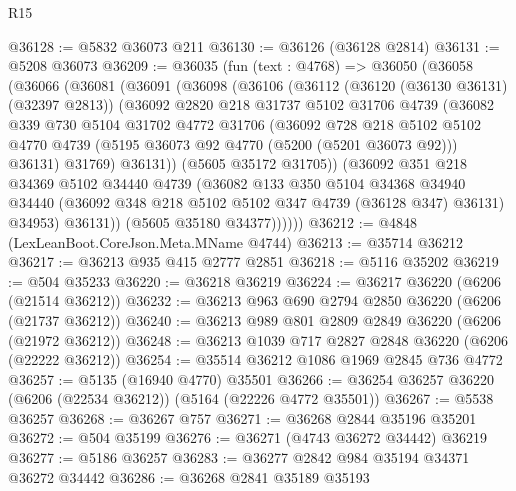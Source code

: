 \begin{lexlean}{R15}
\begin{coremodule}
{{{{{{{{{{{@36128 := @5832 @36073 @211
@36130 := @36126 (@36128 @2814)
@36131 := @5208 @36073
@36209 := @36035
    (fun (text : @4768) =>
    @36050
      (@36058
        (@36066
          (@36081
            (@36091
              (@36098
                (@36106
                  (@36112
                    (@36120 (@36130 @36131) (@32397 @2813))
                    (@36092
                      @2820
                      @218
                      @31737
                      @5102
                      @31706
                      @4739
                      (@36082
                        @339
                        @730
                        @5104
                        @31702
                        @4772
                        @31706
                        (@36092
                          @728
                          @218
                          @5102
                          @5102
                          @4770
                          @4739
                          (@5195 @36073 @92 @4770 (@5200 (@5201 @36073 @92)))
                          @36131)
                        @31769)
                      @36131))
                  (@5605 @35172 @31705))
                (@36092
                  @351
                  @218
                  @34369
                  @5102
                  @34440
                  @4739
                  (@36082
                    @133
                    @350
                    @5104
                    @34368
                    @34940
                    @34440
                    (@36092 @348 @218 @5102 @5102 @347 @4739 (@36128 @347) @36131)
                    @34953)
                  @36131))
              (@5605 @35180 @34377))))))
@36212 := @4848 (LexLeanBoot.CoreJson.Meta.MName @4744)
@36213 := @35714 @36212
@36217 := @36213 @935 @415 @2777 @2851
@36218 := @5116 @35202
@36219 := @504 @35233
@36220 := @36218 @36219
@36224 := @36217 @36220 (@6206 (@21514 @36212))
@36232 := @36213 @963 @690 @2794 @2850 @36220 (@6206 (@21737 @36212))
@36240 := @36213 @989 @801 @2809 @2849 @36220 (@6206 (@21972 @36212))
@36248 := @36213 @1039 @717 @2827 @2848 @36220 (@6206 (@22222 @36212))
@36254 := @35514 @36212 @1086 @1969 @2845 @736 @4772
@36257 := @5135 (@16940 @4770) @35501
@36266 := @36254 @36257 @36220 (@6206 (@22534 @36212)) (@5164 (@22226 @4772 @35501))
@36267 := @5538 @36257
@36268 := @36267 @757
@36271 := @36268 @2844 @35196 @35201
@36272 := @504 @35199
@36276 := @36271 (@4743 @36272 @34442) @36219
@36277 := @5186 @36257
@36283 := @36277 @2842 @984 @35194 @34371 @36272 @34442
@36286 := @36268 @2841 @35189 @35193
}}}}}}}}}}}
\end{coremodule}
\end{lexlean}
